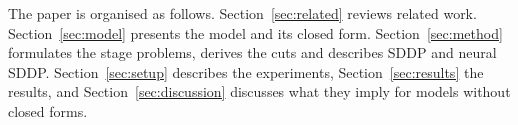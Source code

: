 The paper is organised as follows. Section~\ref{sec:related} reviews related work. Section~\ref{sec:model} presents the model and its closed form. Section~\ref{sec:method} formulates the stage problems, derives the cuts and describes SDDP and neural SDDP. Section~\ref{sec:setup} describes the experiments, Section~\ref{sec:results} the results, and Section~\ref{sec:discussion} discusses what they imply for models without closed forms.

